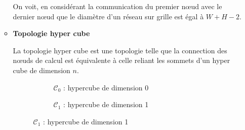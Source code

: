 \documentclass[fleqn,11pt]{article}
\begin{document}
\begin{itemize}
\begin{itemize}
On voit, en considérant la communication du premier n{\oe}ud avec le dernier
n{\oe}ud que le diamètre d'un réseau sur grille est égal à $W+H-2$.

\item \textbf{Topologie hyper cube}

La topologie hyper cube est une topologie telle que la connection des n{\oe}uds de calcul
est équivalente à celle reliant les sommets d'un hyper cube de dimension $n$.

\begin{figure}[h]
\centering
\begin{subfigure}[c]{0.46\textwidth}
\centering
{}
\caption{$\mathcal{C}_{0}$ : hypercube de dimension 0}\label{fig:HypCub0}
\end{subfigure}
\qquad
\begin{subfigure}[c]{0.46\textwidth}
\centering
{}
\caption{$\mathcal{C}_{1}$ : hypercube de dimension 1}\label{fig:HypCub1}
\end{subfigure}


\end{figure}
\end{itemize}
\end{itemize}
\end{document}

